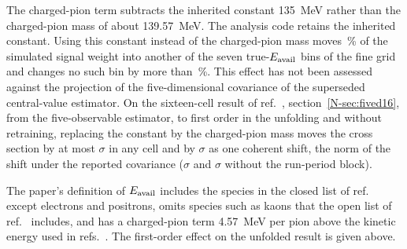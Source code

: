 The charged-pion term subtracts the inherited constant \SI{135}{MeV} rather than the charged-pion mass of about \SI{139.57}{MeV}. The analysis code retains the inherited constant. Using this constant instead of the charged-pion mass moves \,\% of the simulated signal weight into another of the seven true-$E_{\mathrm{avail}}$ bins of the fine grid and changes no such bin by more than \,\%. This effect has not been assessed against the projection of the five-dimensional covariance of the superseded central-value estimator. On the sixteen-cell result of ref.~\cite{AnalysisNote2026}, section~\ref*{N-sec:fived16}, from the five-observable estimator, to first order in the unfolding and without retraining, replacing the constant by the charged-pion mass moves the cross section by at most $\sigma$ in any cell and by $\sigma$ as one coherent shift, the norm of the shift under the reported covariance ($\sigma$ and $\sigma$ without the run-period block).

The paper's definition of $E_{\mathrm{avail}}$ includes the species in the closed list of ref.~\cite{MINERvA:2016lowrecoil} except electrons and positrons, omits species such as kaons that the open list of ref.~\cite{MINERvA:2022incl} includes, and has a charged-pion term \SI{4.57}{MeV} per pion above the kinetic energy used in refs.~\cite{MINERvA:2016lowrecoil,MINERvA:2023avz}. The first-order effect on the unfolded result is given above.

